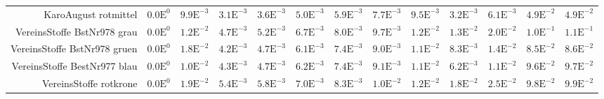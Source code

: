 \begin{landscape}
\begin{table}
\begin{tabularx}{\linewidth}{r | rr | rrrrrr | rrrr}
        KaroAugust rotmittel  & \footnotesize{$0.0\mathrm{E}^{0}$}& \footnotesize{$9.9\mathrm{E}^{-3}$}& \footnotesize{$3.1\mathrm{E}^{-3}$}& \footnotesize{$3.6\mathrm{E}^{-3}$}& \footnotesize{$5.0\mathrm{E}^{-3}$}& \footnotesize{$5.9\mathrm{E}^{-3}$}& \footnotesize{$7.7\mathrm{E}^{-3}$}& \footnotesize{$9.5\mathrm{E}^{-3}$}& \footnotesize{$3.2\mathrm{E}^{-3}$}& \footnotesize{$6.1\mathrm{E}^{-3}$}& \footnotesize{$4.9\mathrm{E}^{-2}$}& \footnotesize{$4.9\mathrm{E}^{-2}$}\\
        VereinsStoffe BstNr978 grau  & \footnotesize{$0.0\mathrm{E}^{0}$}& \footnotesize{$1.2\mathrm{E}^{-2}$}& \footnotesize{$4.7\mathrm{E}^{-3}$}& \footnotesize{$5.2\mathrm{E}^{-3}$}& \footnotesize{$6.7\mathrm{E}^{-3}$}& \footnotesize{$8.0\mathrm{E}^{-3}$}& \footnotesize{$9.7\mathrm{E}^{-3}$}& \footnotesize{$1.2\mathrm{E}^{-2}$}& \footnotesize{$1.3\mathrm{E}^{-2}$}& \footnotesize{$2.0\mathrm{E}^{-2}$}& \footnotesize{$1.0\mathrm{E}^{-1}$}& \footnotesize{$1.1\mathrm{E}^{-1}$}\\
        VereinsStoffe BstNr978 gruen  & \footnotesize{$0.0\mathrm{E}^{0}$}& \footnotesize{$1.8\mathrm{E}^{-2}$}& \footnotesize{$4.2\mathrm{E}^{-3}$}& \footnotesize{$4.7\mathrm{E}^{-3}$}& \footnotesize{$6.1\mathrm{E}^{-3}$}& \footnotesize{$7.4\mathrm{E}^{-3}$}& \footnotesize{$9.0\mathrm{E}^{-3}$}& \footnotesize{$1.1\mathrm{E}^{-2}$}& \footnotesize{$8.3\mathrm{E}^{-3}$}& \footnotesize{$1.4\mathrm{E}^{-2}$}& \footnotesize{$8.5\mathrm{E}^{-2}$}& \footnotesize{$8.6\mathrm{E}^{-2}$}\\
        VereinsStoffe BestNr977 blau  & \footnotesize{$0.0\mathrm{E}^{0}$}& \footnotesize{$1.0\mathrm{E}^{-2}$}& \footnotesize{$4.3\mathrm{E}^{-3}$}& \footnotesize{$4.7\mathrm{E}^{-3}$}& \footnotesize{$6.2\mathrm{E}^{-3}$}& \footnotesize{$7.4\mathrm{E}^{-3}$}& \footnotesize{$9.1\mathrm{E}^{-3}$}& \footnotesize{$1.1\mathrm{E}^{-2}$}& \footnotesize{$6.2\mathrm{E}^{-3}$}& \footnotesize{$1.1\mathrm{E}^{-2}$}& \footnotesize{$9.6\mathrm{E}^{-2}$}& \footnotesize{$9.7\mathrm{E}^{-2}$}\\
        VereinsStoffe rotkrone  & \footnotesize{$0.0\mathrm{E}^{0}$}& \footnotesize{$1.9\mathrm{E}^{-2}$}& \footnotesize{$5.4\mathrm{E}^{-3}$}& \footnotesize{$5.8\mathrm{E}^{-3}$}& \footnotesize{$7.0\mathrm{E}^{-3}$}& \footnotesize{$8.3\mathrm{E}^{-3}$}& \footnotesize{$1.0\mathrm{E}^{-2}$}& \footnotesize{$1.2\mathrm{E}^{-2}$}& \footnotesize{$1.8\mathrm{E}^{-2}$}& \footnotesize{$2.5\mathrm{E}^{-2}$}& \footnotesize{$9.8\mathrm{E}^{-2}$}& \footnotesize{$9.9\mathrm{E}^{-2}$}\\

\end{tabularx}
\end{table}
\end{landscape}
